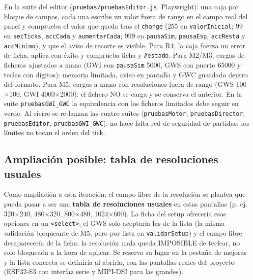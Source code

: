 En la suite del editor (\texttt{pruebas/pruebasEditor.js}, Playwright): una caja por bloque de campos, cada una escribe un valor fuera de rango en el campo real del panel y comprueba el valor que queda tras el \texttt{change} (255 en \texttt{valorInicial}; 99 en \texttt{secTicks}, \texttt{accCada} y \texttt{aumentarCada}; 999 en \texttt{pausaSim}, \texttt{pausaEsp}, \texttt{accResta} y \texttt{accMinimo}), y que el aviso de recorte es visible. Para R4, la caja fuerza un error de ficha, aplica con éxito y comprueba ficha y \texttt{\#estado}. Para M2/M3, cargas de ficheros ajustados a mano (GWI con \texttt{pausaSim} 5000, GWS con puerto 65000 y teclas con dígitos): memoria limitada, aviso en pantalla y GWC guardado dentro del formato. Para M5, cargas a mano con resoluciones fuera de rango (GWS 100$\times$100, GWI 4000$\times$2000): el fichero NO se carga y se conserva el anterior. En la suite \texttt{pruebasGWI\_GWC} la equivalencia con los ficheros limitados debe seguir en verde. Al cierre se re-lanzan las cuatro suites (\texttt{pruebasMotor}, \texttt{pruebasDirector}, \texttt{pruebasEditor}, \texttt{pruebasGWI\_GWC}); no hace falta red de seguridad de partidas: los límites no tocan el orden del tick.

\subsection{Ampliación posible: tabla de resoluciones usuales}
\label{sec:F5I16Resoluciones}

Como ampliación a esta iteración: el campo libre de la resolución se plantea que pueda pasar a ser una \textbf{tabla de resoluciones usuales} en estas pantallas (p. ej. 320×240, 480×320, 800×480, 1024×600). La ficha del setup ofrecería esas opciones en un \texttt{<select>}, el GWS solo aceptaría las de la lista (la misma validación bloqueante de M5, pero por lista en \texttt{validarSetup}) y el campo libre desaparecería de la ficha: la resolución mala queda IMPOSIBLE de teclear, no solo bloqueada a la hora de aplicar. Se reserva su lugar en la pestaña de mejoras y la lista concreta se definiría al abrirla, con las pantallas reales del proyecto (ESP32-S3 con interfaz serie y MIPI-DSI para las grandes).